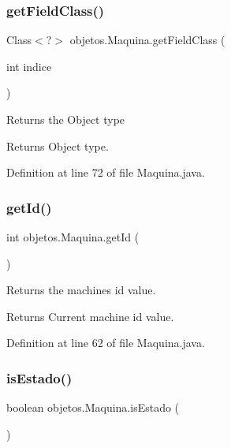 \subsubsection{\texorpdfstring{get\+Field\+Class()}{getFieldClass()}}
{\footnotesize\ttfamily Class$<$?$>$ objetos.\+Maquina.\+get\+Field\+Class (\begin{DoxyParamCaption}\item[{int}]{indice }\end{DoxyParamCaption})}

Returns the Object type

\begin{DoxyReturn}{Returns}
Object type. 
\end{DoxyReturn}


Definition at line 72 of file Maquina.\+java.

\mbox{\label{classobjetos_1_1_maquina_aca30cab810f1072e9ab07024d6f97cc6}} 
\subsubsection{\texorpdfstring{get\+Id()}{getId()}}
{\footnotesize\ttfamily int objetos.\+Maquina.\+get\+Id (\begin{DoxyParamCaption}{ }\end{DoxyParamCaption})}

Returns the machines id value.

\begin{DoxyReturn}{Returns}
Current machine id value. 
\end{DoxyReturn}


Definition at line 62 of file Maquina.\+java.

\mbox{\label{classobjetos_1_1_maquina_a03b4c97926e8db81a5a28459293c16b6}} 
\subsubsection{\texorpdfstring{is\+Estado()}{isEstado()}}
{\footnotesize\ttfamily boolean objetos.\+Maquina.\+is\+Estado (\begin{DoxyParamCaption}{ }\end{DoxyParamCaption})}


